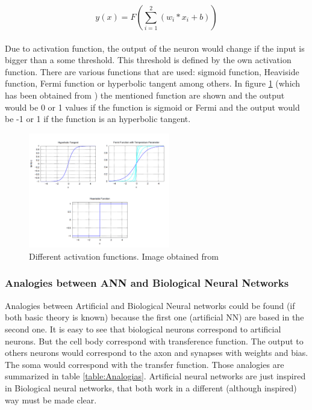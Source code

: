 			\begin{equation}
			y(x)=F(\sum_{i=1}^{2} (w_{i}*x_{i} + b) )
			\label{eq:ecuation_neuronasencilla}
			\end{equation}\\

Due to activation function, the output of the neuron would change if the input is bigger than a some threshold. This threshold is defined by the own activation function. There are various functions that are used: sigmoid function, Heaviside function, Fermi function or hyperbolic tangent among others. In figure \ref{fig:activation_function} (which has been obtained from \cite{BINN}) the mentioned function are shown and the output would be 0 or 1 values if the function is sigmoid or Fermi and the output would be -1 or 1 if the function is an hyperbolic tangent. \\

\begin{figure}[htb]
\centering
\includegraphics[width=0.55\textwidth]{images_miscelaneus/activation_function.PNG}
\caption{Different activation functions. Image obtained from \cite{BINN}} \label{fig:activation_function}
\end{figure}

\subsubsection{Analogies between ANN and Biological Neural Networks}
Analogies between Artificial and Biological Neural networks could be found (if both basic theory is known) because the first one (artificial NN) are based in the second one. It is easy to see that biological neurons correspond to artificial neurons. But the cell body correspond with transference function. The output to others neurons would correspond to the axon and synapses with weights and bias. The soma would correspond with the transfer function. Those analogies are summarized in table \ref{table:Analogias}. Artificial neural networks are just inspired in Biological neural networks, that both work in a different (although inspired) way must be made clear.\\

